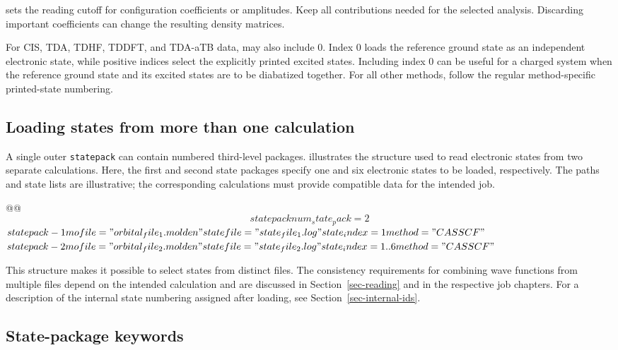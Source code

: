  sets the reading cutoff for configuration coefficients or amplitudes. Keep all contributions needed for the selected analysis. Discarding important coefficients can change the resulting density matrices.

For CIS, TDA, TDHF, TDDFT, and TDA-aTB data,  may also include 0.
Index 0 loads the reference ground state as an independent electronic state, while positive indices select the explicitly printed excited states.
Including index 0 can be useful for a charged system when the reference ground state and its excited states are to be diabatized together.
For all other methods, follow the regular method-specific printed-state numbering.

\subsection{Loading states from more than one calculation}
A single outer \texttt{statepack} can contain numbered third-level packages.  illustrates the structure used to read electronic states from two separate calculations.
Here, the first and second state packages specify one and six electronic states to be loaded, respectively.
The paths and state lists are illustrative; the corresponding calculations must provide compatible data for the intended job.
\begin{lst-script}[escapechar=@]
@@
$$statepack
  num_state_pack = 2
  $$$statepack-1
    mofile = "orbital_file_1.molden"
    statefile = "state_file_1.log"
    state_index = 1
    method = "CASSCF"
  $$$
  $$$statepack-2
    mofile = "orbital_file_2.molden"
    statefile = "state_file_2.log"
    state_index = 1..6
    method = "CASSCF"
  $$$
$$
\end{lst-script}
This structure makes it possible to select states from distinct files. The consistency requirements for combining wave functions from multiple files depend on the intended calculation and are discussed in Section~\ref{sec-reading} and in the respective job chapters. For a description of the internal state numbering assigned after loading, see Section~\ref{sec-internal-ids}.

\subsection{State-package keywords}
\label{sec-state-package-keywords}
